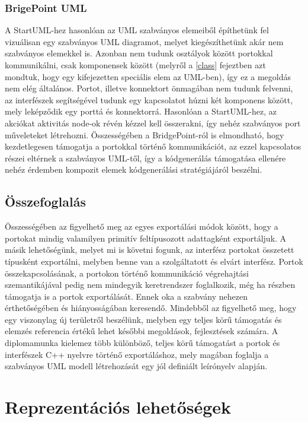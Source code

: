 \documentclass[a4paper,12pt]{report}
\begin{document}
\subsection{BrigePoint UML}
A StartUML-hez hasonlóan az UML szabványos elemeiből építhetünk fel vizuálisan egy szabványos UML diagramot, melyet kiegészíthetünk akár nem szabványos elemekkel is. Azonban nem tudunk osztályok között portokkal kommunikálni, csak komponensek között (melyről a \ref{class} fejeztben azt mondtuk, hogy egy kifejezetten speciális elem az UML-ben), így ez a megoldás nem elég általános. Portot, illetve konnektort önmagában nem tudunk felvenni, az interfészek segítségével tudunk egy kapcsolatot húzni két komponens között, mely leképződik egy porttá és konnektorrá. Hasonlóan a StartUML-hez, az akciókat aktivitás node-ok révén kézzel kell összerakni, így nehéz szabványos port műveleteket létrehozni. Összességében a BridgePoint-ról \cite{bridge} is elmondható, hogy kezdetlegesen támogatja a portokkal történő kommunikációt, az ezzel kapcsolatos részei eltérnek a szabványos UML-től, így a kódgenerálás támogatása ellenére nehéz érdemben kompozit elemek kódgenerálási stratégiájáról beszélni. 

\section{Összefoglalás}
Összességében az figyelhető meg az egyes exportálási módok között, hogy a portokat mindig valamilyen primitív feltípusozott adattagként exportáljuk. A másik lehetőségünk, melyet mi is követni fogunk, az interfész portokat összetett típusként exportálni, melyben benne van a szolgáltatott és elvárt interfész. Portok összekapcsolásának, a portokon történő kommunikáció végrehajtási szemantikájával pedig nem mindegyik keretrendszer foglalkozik, még ha részben támogatja is a portok exportálását. Ennek oka a szabvány nehezen érthetőségében és hiányosságában keresendő. Mindebből az figyelhető meg, hogy egy viszonylag új területről beszélünk, melyben egy teljes körű támogatás és elemzés referencia értékű lehet későbbi megoldások, fejlesztések számára. A diplomamunka kielemez több különböző, teljes körű támogatást a portok és interfészek C++ nyelvre történő exportáláshoz, mely magában foglalja a szabványos UML modell létrehozását egy jól definiált leírónyelv alapján.

\chapter{Reprezentációs lehetőségek} \label{reprezentation}
\end{document}
